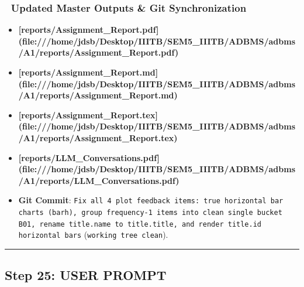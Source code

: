 \documentclass[11pt,a4paper]{article}
\begin{document}
\subsubsection{📄 Updated Master Outputs \& Git Synchronization}
\begin{itemize}
\item \textbf{[reports/Assignment\_Report.pdf](file:///home/jdsb/Desktop/IIITB/SEM5\_IIITB/ADBMS/adbms/A1/reports/Assignment\_Report.pdf)}
\item \textbf{[reports/Assignment\_Report.md](file:///home/jdsb/Desktop/IIITB/SEM5\_IIITB/ADBMS/adbms/A1/reports/Assignment\_Report.md)}
\item \textbf{[reports/Assignment\_Report.tex](file:///home/jdsb/Desktop/IIITB/SEM5\_IIITB/ADBMS/adbms/A1/reports/Assignment\_Report.tex)}
\item \textbf{[reports/LLM\_Conversations.pdf](file:///home/jdsb/Desktop/IIITB/SEM5\_IIITB/ADBMS/adbms/A1/reports/LLM\_Conversations.pdf)}
\item \textbf{Git Commit}: \texttt{Fix all 4 plot feedback items: true horizontal bar charts (barh), group frequency-1 items into clean single bucket B01, rename title.name to title.title, and render title.id horizontal bars} (\texttt{working tree clean}).
\end{itemize}

\hrule

\subsection{Step 25: USER PROMPT}
\end{document}

